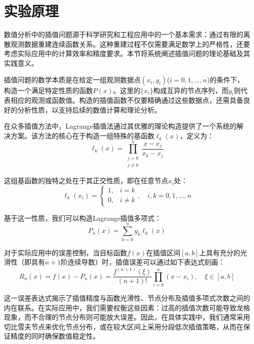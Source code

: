 \documentclass{joulabreport}
\author{Ilya Sutskever}
\begin{document}
\maketitle%
{\song\xiaosi%
\section{实验原理}
数值分析中的插值问题源于科学研究和工程应用中的一个基本需求\cite{ref1}：通过有限的离散观测数据重建连续函数关系。这种重建过程不仅需要满足数学上的严格性\cite{ref2}，还要考虑实际应用中的计算效率和精度要求。本节将系统阐述插值问题的理论基础及其实践意义\cite{ref3,ref4}。

插值问题的数学本质是在给定一组观测数据点$(x_i, y_i)$($i=0,1,\ldots,n$)的条件下，构造一个满足特定性质的函数$P(x)$。这里的$\{x_i\}$构成互异的节点序列，而$y_i$则代表相应的观测或函数值。构造的插值函数不仅要精确通过这些数据点，还需具备良好的分析性质，以支持后续的数值计算和理论分析。

在众多插值方法中，Lagrange插值法通过其优雅的理论构造提供了一个系统的解决方案。该方法的核心在于构造一组特殊的基函数$\ell_k(x)$，定义为：
\begin{equation}
\ell_k(x) = \prod_{\substack{j=0\\j\neq k}}^n \frac{x-x_j}{x_k-x_j}
\end{equation}

这组基函数的独特之处在于其正交性质，即在任意节点$x_i$处：
\begin{equation}
\ell_k(x_i) = \begin{cases}
1, & i = k \\
0, & i \neq k
\end{cases}, \quad i,k = 0,1,\ldots,n
\end{equation}

基于这一性质，我们可以构造Lagrange插值多项式：
\begin{equation}
P_n(x) = \sum_{k=0}^n y_k\ell_k(x)
\end{equation}

对于实际应用中的误差控制，当目标函数$f(x)$在插值区间$[a,b]$上具有充分的光滑性（即具有$n+1$阶连续导数）时，插值误差可以通过如下表达式刻画：
\begin{equation}
R_n(x) = f(x) - P_n(x) = \frac{f^{(n+1)}(\xi)}{(n+1)!}\prod_{i=0}^n(x-x_i), \quad \xi \in [a,b]
\end{equation}

这一误差表达式揭示了插值精度与函数光滑性、节点分布及插值多项式次数之间的内在联系。在实际应用中，我们需要权衡这些因素：过高的插值次数可能导致龙格现象，而不合理的节点分布则可能放大误差。因此，在具体实践中，我们通常采用切比雪夫节点来优化节点分布，或在较大区间上采用分段低次插值策略，从而在保证精度的同时确保数值稳定性。

}
\end{document}

